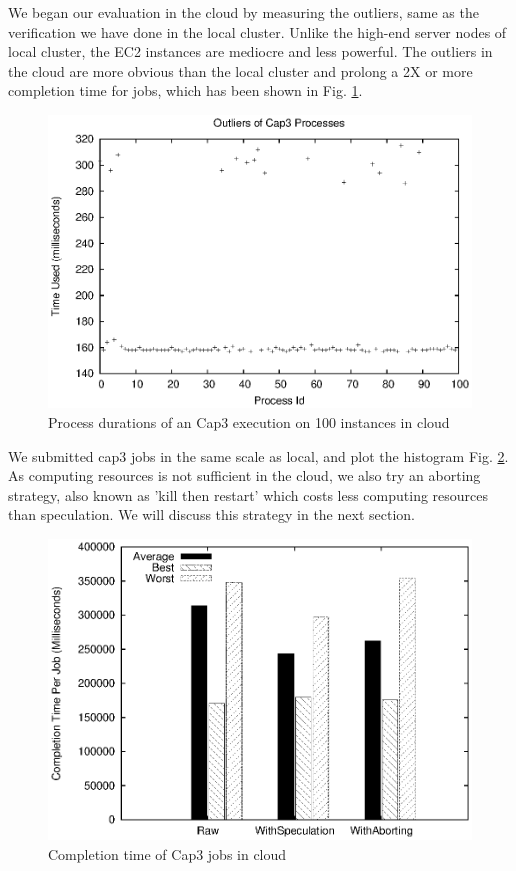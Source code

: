 We began our evaluation in the cloud by measuring the outliers, same as the verification
we have done in the local cluster. Unlike the high-end server nodes of local cluster, the
EC2 instances are mediocre and less powerful. The outliers in the cloud are more obvious
than the local cluster and prolong a 2X or more completion time for jobs, which has been
shown in Fig. \ref{figure:outlier_cloud}.

\begin{figure}
\centering
\includegraphics[width=0.9\columnwidth]{figures/cloud_outliers.eps}
\caption{Process durations of an Cap3 execution on 100 instances in cloud}
\label{figure:outlier_cloud}
\end{figure}

We submitted cap3 jobs in the same scale as local, and plot the histogram Fig.
\ref{figure:completiontime_cap3_cloud}. As computing resources is not sufficient in the
cloud, we also try an aborting strategy, also known as 'kill then restart' which costs less
computing resources than speculation. We will discuss this strategy in the next
section.

\begin{figure}
\centering
\includegraphics[width=0.9\columnwidth]{figures/cloud_completiontime_cap3.eps}
\caption{Completion time of Cap3 jobs in cloud}
\label{figure:completiontime_cap3_cloud}
\end{figure}

